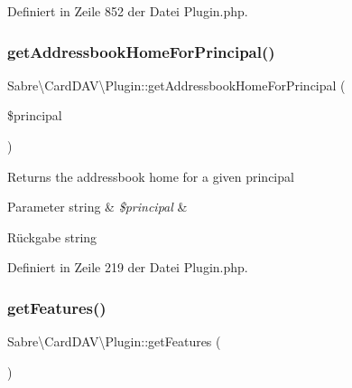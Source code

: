 Definiert in Zeile 852 der Datei Plugin.\+php.

\mbox{\label{class_sabre_1_1_card_d_a_v_1_1_plugin_a37ea9c1f3810dd366e726518b0b1f609}} 
\subsubsection{\texorpdfstring{get\+Addressbook\+Home\+For\+Principal()}{getAddressbookHomeForPrincipal()}}
{\footnotesize\ttfamily Sabre\textbackslash{}\+Card\+D\+A\+V\textbackslash{}\+Plugin\+::get\+Addressbook\+Home\+For\+Principal (\begin{DoxyParamCaption}\item[{}]{\$principal }\end{DoxyParamCaption})\hspace{0.3cm}{\ttfamily [protected]}}

Returns the addressbook home for a given principal


\begin{DoxyParams}[1]{Parameter}
string & {\em \$principal} & \\
\hline
\end{DoxyParams}
\begin{DoxyReturn}{Rückgabe}
string 
\end{DoxyReturn}


Definiert in Zeile 219 der Datei Plugin.\+php.

\mbox{\label{class_sabre_1_1_card_d_a_v_1_1_plugin_af27ac378dd0c8a6061c80a2f85f20849}} 
\subsubsection{\texorpdfstring{get\+Features()}{getFeatures()}}
{\footnotesize\ttfamily Sabre\textbackslash{}\+Card\+D\+A\+V\textbackslash{}\+Plugin\+::get\+Features (\begin{DoxyParamCaption}{ }\end{DoxyParamCaption})}

